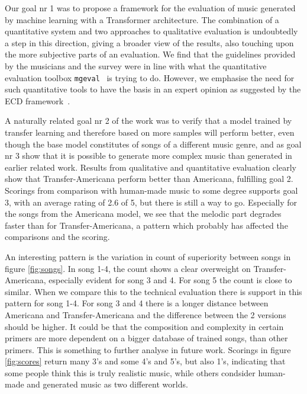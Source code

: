 \documentclass{IEEEtran}
\begin{document}
Our goal nr 1 was to propose a framework for the evaluation of music generated
by machine learning with a Transformer architecture.
The combination of a quantitative system and two approaches to qualitative
evaluation is undoubtedly a step in this direction, giving a broader view of 
the results, also touching upon the more
subjective parts of an evaluation. We find that the guidelines provided by 
the musicians and the survey were in line with what the quantitative evaluation 
toolbox \lstinline|mgeval|~\cite{yang2020evaluation} is trying to 
do. However, we emphasise the need for such quantitative tools to have the basis
in an expert opinion as suggested by the ECD
framework~\cite{mislevy2003focus,mislevy2017evidence}.

A naturally related goal nr 2 of the work was to verify that a model trained by transfer
learning and therefore based on more samples will perform better, even though
the base model constitutes of songs of a different music genre, and as goal nr 3 show
that it is possible to generate more complex music than generated in earlier
related work. Results from qualitative and quantitative evaluation clearly
show that Transfer-Americana perform better than Americana, fulfilling goal
2. Scorings from comparison with human-made music to some degree supports
goal 3, with an average rating of 2.6 of 5, but there is still a way to go.
Especially for the songs from the Americana model, we see that the melodic
part degrades faster than for Transfer-Americana, a pattern which probably has
affected the comparisons and the scoring.

An interesting pattern is the variation in count of superiority between songs
in figure \ref{fig:songs}. In song 1-4, the count shows a clear overweight on
Transfer-Americana, especially evident for song 3 and 4. For song 5 the count
is close to similar. When we compare this to the technical evaluation there is 
support in this pattern for song 1-4. For song 3 and 4 there is a longer distance 
between Americana and Transfer-Americana and the difference between the 2 versions 
should be higher. It could be that the composition and complexity in
certain primers are more dependent on a bigger database of trained songs, than
other primers. This is something to further analyse in future work. Scorings
in figure \ref{fig:scores} return many 3's and some 4's and 5's, but also
1's, indicating that some people think this is truly realistic music, while
others condsider human-made and generated music as two different worlds.
\end{document}
